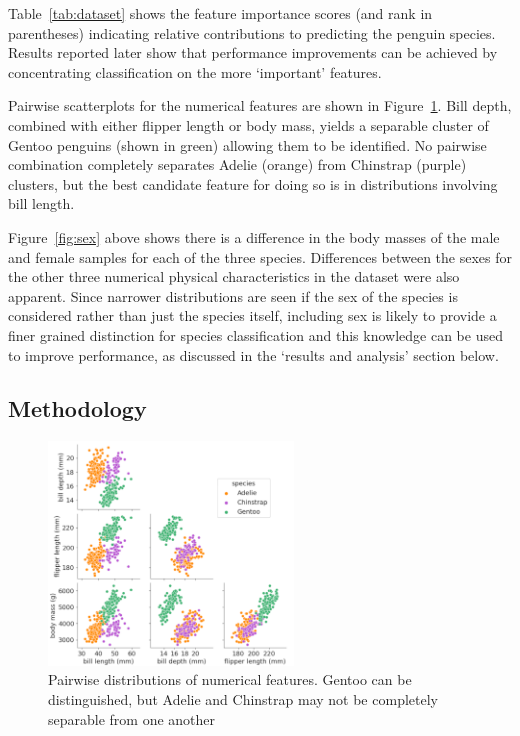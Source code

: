 \documentclass[12pt]{article}
\begin{document}
Table~\ref{tab:dataset} shows the feature importance scores (and rank in parentheses) indicating
relative contributions to predicting the penguin species.
Results reported later show that performance improvements can be achieved by
concentrating classification on the more `important' features.

Pairwise scatterplots for the numerical features are shown in Figure~\ref{fig:pairwise}. 
Bill depth, combined with either flipper length or body mass, 
yields a separable cluster of Gentoo penguins (shown in green) allowing them to be identified. 
No pairwise combination completely separates Adelie (orange) from Chinstrap (purple) clusters, 
but the best candidate feature for doing so is in distributions involving bill length.

Figure~\ref{fig:sex} above shows there is a difference in the body masses of the male and female samples for each of the three species. 
Differences between the sexes for the other three numerical physical characteristics in the dataset were also apparent. 
Since narrower distributions are seen if the sex of the species is considered rather than just the species itself, 
including sex is likely to provide a finer grained distinction for species classification 
and this knowledge can be used to improve performance, as discussed in the `results and analysis' section below. 

\subsection*{Methodology}

\begin{figure} %
  \centering
  \vspace{-4\baselineskip} %
  \includegraphics[width=0.58\textwidth]{pairwise.png} %
  \vspace{-1.5\baselineskip} %
  \caption{\centering\linespread{0.8}\selectfont Pairwise distributions of numerical features. Gentoo can be distinguished, 
  but Adelie and Chinstrap may not be completely separable from one another}
  \vspace{-1\baselineskip} %
  \label{fig:pairwise}
\end{figure}
\end{document}
